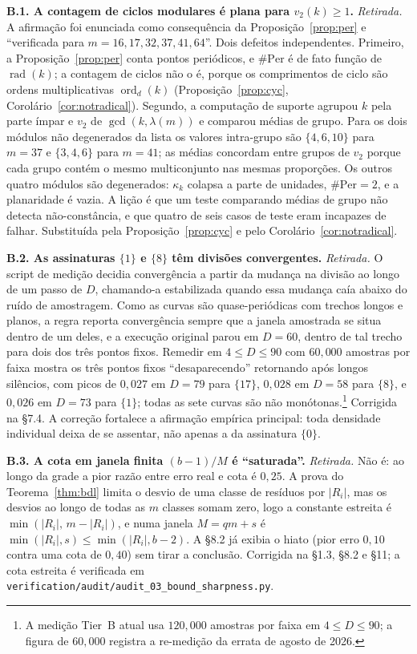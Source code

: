 \documentclass[11pt]{article}
\theoremstyle{definition}
\theoremstyle{remark}
\newcommand{\Per}{\mathrm{Per}}
\DeclareMathOperator{\ord}{ord}
\DeclareMathOperator{\rad}{rad}
\begin{document}
\medskip
\noindent\textbf{B.1. A contagem de ciclos modulares é plana para $v_2(k) \ge 1$.} \emph{Retirada.} A afirmação foi enunciada como consequência da Proposição~\ref{prop:per} e ``verificada para $m = 16, 17, 32, 37, 41, 64$''. Dois defeitos independentes. Primeiro, a Proposição~\ref{prop:per} conta pontos periódicos, e $\#\Per$ é de fato função de $\rad(k)$; a contagem de ciclos não o é, porque os comprimentos de ciclo são ordens multiplicativas $\ord_d(k)$ (Proposição~\ref{prop:cyc}, Corolário~\ref{cor:notradical}). Segundo, a computação de suporte agrupou $k$ pela parte ímpar e $v_2$ de $\gcd(k,\lambda(m))$ e comparou médias de grupo. Para os dois módulos não degenerados da lista os valores intra-grupo são $\{4,6,10\}$ para $m=37$ e $\{3,4,6\}$ para $m=41$; as médias concordam entre grupos de $v_2$ porque cada grupo contém o mesmo multiconjunto nas mesmas proporções. Os outros quatro módulos são degenerados: $\kappa_k$ colapsa a parte de unidades, $\#\Per = 2$, e a planaridade é vazia. A lição é que um teste comparando médias de grupo não detecta não-constância, e que quatro de seis casos de teste eram incapazes de falhar. Substituída pela Proposição~\ref{prop:cyc} e pelo Corolário~\ref{cor:notradical}.

\medskip
\noindent\textbf{B.2. As assinaturas $\{1\}$ e $\{8\}$ têm divisões convergentes.} \emph{Retirada.} O script de medição decidia convergência a partir da mudança na divisão ao longo de um passo de $D$, chamando-a estabilizada quando essa mudança caía abaixo do ruído de amostragem. Como as curvas são quase-periódicas com trechos longos e planos, a regra reporta convergência sempre que a janela amostrada se situa dentro de um deles, e a execução original parou em $D = 60$, dentro de tal trecho para dois dos três pontos fixos. Remedir em $4 \le D \le 90$ com $60{,}000$ amostras por faixa mostra os três pontos fixos ``desaparecendo'' retornando após longos silêncios, com picos de $0{,}027$ em $D = 79$ para $\{17\}$, $0{,}028$ em $D = 58$ para $\{8\}$, e $0{,}026$ em $D = 73$ para $\{1\}$; todas as sete curvas são não monótonas.\footnote{A medição Tier~B atual usa $120{,}000$ amostras por faixa em $4 \le D \le 90$; a figura de $60{,}000$ registra a re-medição da errata de agosto de 2026.} Corrigida na \S7.4. A correção fortalece a afirmação empírica principal: toda densidade individual deixa de se assentar, não apenas a da assinatura $\{0\}$.

\medskip
\noindent\textbf{B.3. A cota em janela finita $(b-1)/M$ é ``saturada''.} \emph{Retirada.} Não é: ao longo da grade a pior razão entre erro real e cota é $0{,}25$. A prova do Teorema~\ref{thm:bdl} limita o desvio de uma classe de resíduos por $|R_i|$, mas os desvios ao longo de todas as $m$ classes somam zero, logo a constante estreita é $\min(|R_i|,\,m-|R_i|)$, e numa janela $M = qm + s$ é $\min(|R_i|, s) \le \min(|R_i|, b-2)$. A \S8.2 já exibia o hiato (pior erro $0{,}10$ contra uma cota de $0{,}40$) sem tirar a conclusão. Corrigida na \S1.3, \S8.2 e \S11; a cota estreita é verificada em \texttt{verification/audit/audit\_03\_bound\_sharpness.py}.
\end{document}
